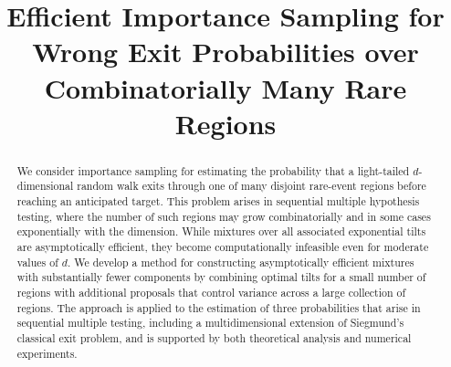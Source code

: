 \documentclass[aap,preprint]{imsart}
\theoremstyle{plain}
\theoremstyle{definition}
\begin{document}
\begin{frontmatter}

\title{Efficient Importance Sampling for Wrong Exit Probabilities over Combinatorially Many Rare Regions}




 


\begin{abstract}
We consider importance sampling for estimating the probability that a light-tailed $d$-dimensional random walk exits through one of many disjoint rare-event regions before reaching an anticipated target. This problem arises in sequential multiple hypothesis testing, where the number of such regions may grow combinatorially and in some cases exponentially with the dimension. While mixtures over all associated exponential tilts are asymptotically efficient, they become computationally infeasible even for moderate values of $d$. We develop a method for constructing asymptotically efficient mixtures with substantially fewer components by combining optimal tilts for a small number of regions with additional proposals that control variance across a large collection of regions. The approach is applied to the estimation of three probabilities that arise in sequential multiple testing, including a multidimensional extension of Siegmund's classical exit problem, and is supported by both theoretical analysis and numerical experiments.
\end{abstract}
 







\end{frontmatter}
\end{document}
